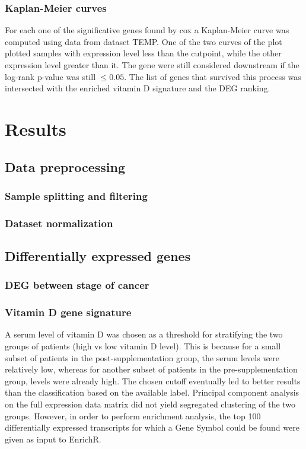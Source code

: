 \documentclass[fleqn,10pt]{SelfArx} %
\begin{document}
		\subsubsection{Kaplan-Meier curves}
		For each one of the significative genes found by cox a Kaplan-Meier curve was computed using data from dataset TEMP.
		One of the two curves of the plot plotted samples with expression level less than the cutpoint, while the other expression level greater than it.
		The gene were still considered downstream if the log-rank p-value was still $\le0.05$.
		The list of genes that survived this process was intersected with the enriched vitamin D signature and the DEG ranking.






\section{Results}

	\subsection{Data preprocessing}

		\subsubsection{Sample splitting and filtering}

		\subsubsection{Dataset normalization}

	\subsection{Differentially expressed genes}

		\subsubsection{DEG between stage of cancer}

		\subsubsection{Vitamin D gene signature}
		A serum level of vitamin D was chosen as a threshold for stratifying the two groups of patients (high vs low vitamin D level). This is because for a small subset of patients in the post-supplementation group, the serum levels were relatively low, whereas for another subset of patients in the pre-supplementation group, levels were already high. The chosen cutoff eventually led to better results than the classification based on the available label.
		Principal component analysis on the full expression data matrix did not yield segregated clustering of the two groups.
		 However, in order to perform enrichment analysis, the top 100 differentially expressed transcripts for which a Gene Symbol could be found were given as input to EnrichR.
\end{document}
